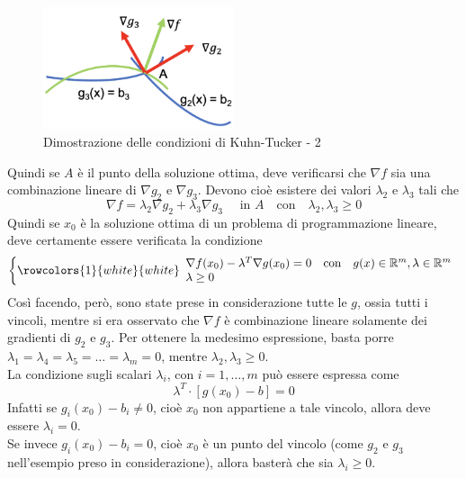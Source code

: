 \documentclass[a4paper]{extarticle}
\begin{document}
\begin{figure}[H]
    \centering
    \includegraphics[width=0.5\textwidth]{dimostrazione-khun-tucker-2.png}
    \caption{Dimostrazione delle condizioni di Kuhn-Tucker - 2}
    \label{fig:fig5}
\end{figure}

\vspace{1em}
\noindent
Quindi se $A$ è il punto della soluzione ottima, deve verificarsi che $\nabla f$ sia una combinazione lineare di $\nabla g_2$ e $\nabla g_3$. Devono cioè esistere dei valori $\lambda_2$ e $\lambda_3$ tali che
\[\nabla f = \lambda_2 \nabla g_2 + \lambda_3 \nabla g_3 \hspace{1em} \text{ in } A \hspace{1em} \text{con} \hspace{1em} \lambda_2, \lambda_3 \geq 0\]
Quindi se $x_0$ è la soluzione ottima di un problema di programmazione lineare, deve certamente essere verificata la condizione
\[
    \left\{
        \rowcolors{1}{white}{white}
        \begin{array}{lll}
            \nabla f(x_0) - \lambda^T \nabla g(x_0) = 0 & \text{con} & g(x) \in \mathbb{R}^m, \lambda \in \mathbb{R}^m\\
            \lambda \geq 0\\
        \end{array}
    \right.
\]
Così facendo, però, sono state prese in considerazione tutte le $g$, ossia tutti i vincoli, mentre si era osservato che $\nabla f$ è combinazione lineare solamente dei gradienti di $g_2$ e $g_3$. Per ottenere la medesimo espressione, basta porre $\lambda_1 = \lambda_4 = \lambda_5 = \dots = \lambda_m = 0$, mentre $\lambda_2, \lambda_3 \geq 0$.\\
La condizione sugli scalari $\lambda_i$, con $i = 1,\dots, m$ può essere espressa come
\[\lambda^T \cdot \left[g(x_0) - b\right] = 0\]
Infatti se $g_i(x_0) - b_i  \neq 0$, cioè $x_0$ non appartiene a tale vincolo, allora deve essere $\lambda_i = 0$.\\
Se invece $g_i(x_0) - b_i = 0$, cioè $x_0$ è un punto del vincolo (come $g_2$ e $g_3$ nell'esempio preso in considerazione), allora basterà che sia $\lambda_i \geq 0$.\\
\end{document}
